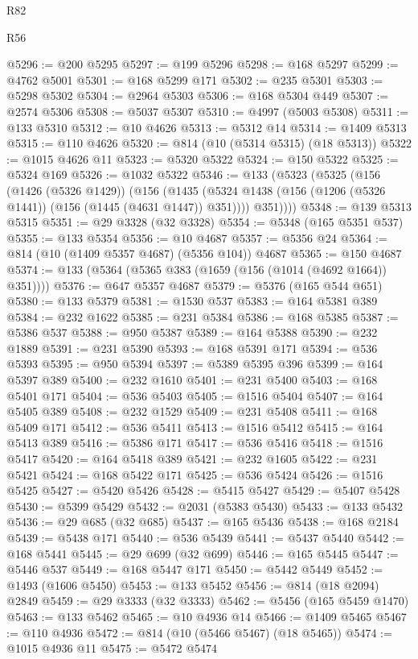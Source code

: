 \begin{lexlean}{R82}
\begin{lexlean}{R56}
\begin{coremodule}
{{{{{{{{{{{{{{{{{{{{{{{{{{{{{{{{{{{{{{{{{{{{{{{{{{{{{{{{{{{{{{{{{{{{{{{{{{{{{{{{{{{{{{{{{{{{{{{{{{{{{{{{{{{{{{{{{{{{{{{{{{{{{{{{{{{{{{{{{{{{{{{{{{{{{{{{{{{{{{{{{{{{{{{{{{{{{{{{{{{{{{{{{{{{{{{{{{{{{{{{{{{{{{{{{{{@5296 := @200 @5295
@5297 := @199 @5296
@5298 := @168 @5297
@5299 := @4762 @5001
@5301 := @168 @5299 @171
@5302 := @235 @5301
@5303 := @5298 @5302
@5304 := @2964 @5303
@5306 := @168 @5304 @449
@5307 := @2574 @5306
@5308 := @5037 @5307
@5310 := @4997 (@5003 @5308)
@5311 := @133 @5310
@5312 := @10 @4626
@5313 := @5312 @14
@5314 := @1409 @5313
@5315 := @110 @4626
@5320 := @814 (@10 (@5314 @5315) (@18 @5313))
@5322 := @1015 @4626 @11
@5323 := @5320 @5322
@5324 := @150 @5322
@5325 := @5324 @169
@5326 := @1032 @5322
@5346 := @133
    (@5323
      (@5325
        (@156
          (@1426 (@5326 @1429))
          (@156
            (@1435 (@5324 @1438 (@156 (@1206 (@5326 @1441)) (@156 (@1445 (@4631 @1447)) @351))))
            @351))))
@5348 := @139 @5313 @5315
@5351 := @29 @3328 (@32 @3328)
@5354 := @5348 (@165 @5351 @537)
@5355 := @133 @5354
@5356 := @10 @4687
@5357 := @5356 @24
@5364 := @814 (@10 (@1409 @5357 @4687) (@5356 @104)) @4687
@5365 := @150 @4687
@5374 := @133 (@5364 (@5365 @383 (@1659 (@156 (@1014 (@4692 @1664)) @351))))
@5376 := @647 @5357 @4687
@5379 := @5376 (@165 @544 @651)
@5380 := @133 @5379
@5381 := @1530 @537
@5383 := @164 @5381 @389
@5384 := @232 @1622
@5385 := @231 @5384
@5386 := @168 @5385
@5387 := @5386 @537
@5388 := @950 @5387
@5389 := @164 @5388
@5390 := @232 @1889
@5391 := @231 @5390
@5393 := @168 @5391 @171
@5394 := @536 @5393
@5395 := @950 @5394
@5397 := @5389 @5395 @396
@5399 := @164 @5397 @389
@5400 := @232 @1610
@5401 := @231 @5400
@5403 := @168 @5401 @171
@5404 := @536 @5403
@5405 := @1516 @5404
@5407 := @164 @5405 @389
@5408 := @232 @1529
@5409 := @231 @5408
@5411 := @168 @5409 @171
@5412 := @536 @5411
@5413 := @1516 @5412
@5415 := @164 @5413 @389
@5416 := @5386 @171
@5417 := @536 @5416
@5418 := @1516 @5417
@5420 := @164 @5418 @389
@5421 := @232 @1605
@5422 := @231 @5421
@5424 := @168 @5422 @171
@5425 := @536 @5424
@5426 := @1516 @5425
@5427 := @5420 @5426
@5428 := @5415 @5427
@5429 := @5407 @5428
@5430 := @5399 @5429
@5432 := @2031 (@5383 @5430)
@5433 := @133 @5432
@5436 := @29 @685 (@32 @685)
@5437 := @165 @5436
@5438 := @168 @2184
@5439 := @5438 @171
@5440 := @536 @5439
@5441 := @5437 @5440
@5442 := @168 @5441
@5445 := @29 @699 (@32 @699)
@5446 := @165 @5445
@5447 := @5446 @537
@5449 := @168 @5447 @171
@5450 := @5442 @5449
@5452 := @1493 (@1606 @5450)
@5453 := @133 @5452
@5456 := @814 (@18 @2094) @2849
@5459 := @29 @3333 (@32 @3333)
@5462 := @5456 (@165 @5459 @1470)
@5463 := @133 @5462
@5465 := @10 @4936 @14
@5466 := @1409 @5465
@5467 := @110 @4936
@5472 := @814 (@10 (@5466 @5467) (@18 @5465))
@5474 := @1015 @4936 @11
@5475 := @5472 @5474
}}}}}}}}}}}}}}}}}}}}}}}}}}}}}}}}}}}}}}}}}}}}}}}}}}}}}}}}}}}}}}}}}}}}}}}}}}}}}}}}}}}}}}}}}}}}}}}}}}}}}}}}}}}}}}}}}}}}}}}}}}}}}}}}}}}}}}}}}}}}}}}}}}}}}}}}}}}}}}}}}}}}}}}}}}}}}}}}}}}}}}}}}}}}}}}}}}}}}}}}}}}}}}}}}}}
\end{coremodule}
\end{lexlean}
\end{lexlean}
